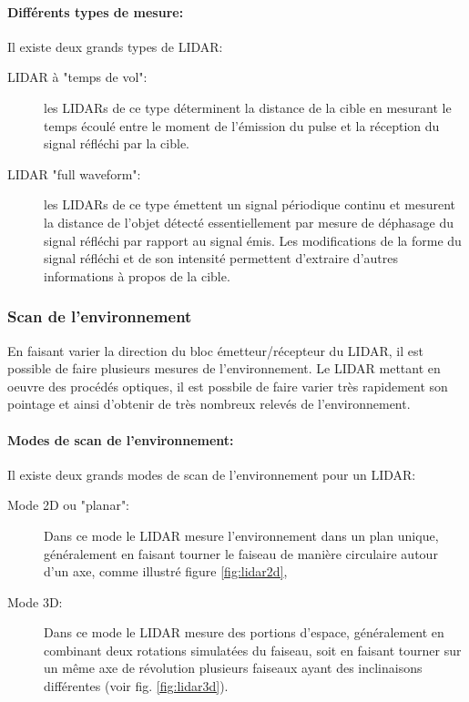 \documentclass[12pt,a4paper]{report}
\begin{document}
		\paragraph*{Différents types de mesure: } Il existe deux grands types de LIDAR: \begin{description}
			\item[LIDAR  à "temps de vol":] les LIDARs de ce type déterminent la distance de la cible en mesurant le temps écoulé entre le moment de l'émission du pulse et la réception du signal réfléchi par la cible.
			\item[LIDAR  "full waveform":] les LIDARs de ce type émettent un signal périodique continu et mesurent la distance de l'objet détecté essentiellement par mesure de déphasage du signal réfléchi par rapport au signal émis. Les modifications de la forme du signal réfléchi et de son intensité permettent d'extraire d'autres informations à propos de la cible. 
		\end{description} 
		
		\subsubsection{Scan de l'environnement}
		En faisant varier la direction du bloc émetteur/récepteur du LIDAR, il est possible de faire plusieurs mesures de l'environnement. Le LIDAR mettant en oeuvre des procédés optiques, il est possbile de faire varier très rapidement son pointage et ainsi d'obtenir de très nombreux relevés de l'environnement.
		
		\paragraph*{Modes de scan de l'environnement:} Il existe deux grands modes de scan de l'environnement pour un LIDAR:
		
		\begin{description}
			\item[Mode 2D ou  "planar":] Dans ce mode le LIDAR mesure l'environnement dans un plan unique, généralement en faisant tourner le faiseau de manière circulaire autour d'un axe, comme illustré figure \ref{fig:lidar2d},
			\item[Mode 3D:] Dans ce mode le LIDAR mesure des portions d'espace, généralement en combinant deux rotations simulatées du faiseau, soit en faisant tourner sur un même axe de révolution plusieurs faiseaux ayant des inclinaisons différentes (voir fig. \ref{fig:lidar3d}).
		\end{description}
	
\end{document}
